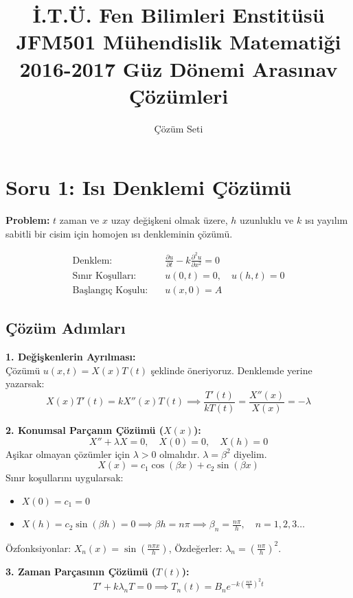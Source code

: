 \documentclass[12pt, a4paper]{article}
\title{\textbf{İ.T.Ü. Fen Bilimleri Enstitüsü \\ JFM501 Mühendislik Matematiği \\ 2016-2017 Güz Dönemi Arasınav Çözümleri}}
\author{Çözüm Seti}
\date{}
\begin{document}
\maketitle

\section*{Soru 1: Isı Denklemi Çözümü}
\textbf{Problem:} $t$ zaman ve $x$ uzay değişkeni olmak üzere, $h$ uzunluklu ve $k$ ısı yayılım sabitli bir cisim için homojen ısı denkleminin çözümü.

\begin{align*}
    \text{Denklem:} \quad & \frac{\partial u}{\partial t} - k \frac{\partial^2 u}{\partial x^2} = 0 \\
    \text{Sınır Koşulları:} \quad & u(0,t) = 0, \quad u(h,t) = 0 \\
    \text{Başlangıç Koşulu:} \quad & u(x,0) = A
\end{align*}

\subsection*{Çözüm Adımları}
\textbf{1. Değişkenlerin Ayrılması:} \\
Çözümü $u(x,t) = X(x)T(t)$ şeklinde öneriyoruz. Denklemde yerine yazarsak:
\[
X(x)T'(t) = k X''(x)T(t) \implies \frac{T'(t)}{k T(t)} = \frac{X''(x)}{X(x)} = -\lambda
\]

\textbf{2. Konumsal Parçanın Çözümü ($X(x)$):} \\
\[ X'' + \lambda X = 0, \quad X(0)=0, \quad X(h)=0 \]
Aşikar olmayan çözümler için $\lambda > 0$ olmalıdır. $\lambda = \beta^2$ diyelim.
\[ X(x) = c_1 \cos(\beta x) + c_2 \sin(\beta x) \]
Sınır koşullarını uygularsak:
\begin{itemize}
    \item $X(0) = c_1 = 0$
    \item $X(h) = c_2 \sin(\beta h) = 0 \implies \beta h = n\pi \implies \beta_n = \frac{n\pi}{h}, \quad n=1,2,3\dots$
\end{itemize}
Özfonksiyonlar: $X_n(x) = \sin\left(\frac{n\pi x}{h}\right)$, Özdeğerler: $\lambda_n = \left(\frac{n\pi}{h}\right)^2$.

\textbf{3. Zaman Parçasının Çözümü ($T(t)$):} \\
\[ T' + k\lambda_n T = 0 \implies T_n(t) = B_n e^{-k \left(\frac{n\pi}{h}\right)^2 t} \]
\end{document}
